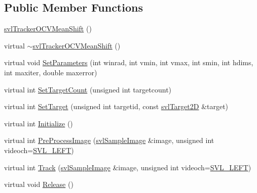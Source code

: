 \subsection*{Public Member Functions}
\begin{DoxyCompactItemize}
\item 
\hyperlink{classsvl_tracker_o_c_v_mean_shift_a3d3446eced3addc41fca298f43703e15}{svl\-Tracker\-O\-C\-V\-Mean\-Shift} ()
\item 
virtual \hyperlink{classsvl_tracker_o_c_v_mean_shift_a7ea83fe3b1d9bfbee4358dc97067eaea}{$\sim$svl\-Tracker\-O\-C\-V\-Mean\-Shift} ()
\item 
virtual void \hyperlink{classsvl_tracker_o_c_v_mean_shift_aef31184a9ab91ca20bc329a4af22ce9a}{Set\-Parameters} (int winrad, int vmin, int vmax, int smin, int hdims, int maxiter, double maxerror)
\item 
virtual int \hyperlink{classsvl_tracker_o_c_v_mean_shift_a323dbe231d319def26e8ce46b734e375}{Set\-Target\-Count} (unsigned int targetcount)
\item 
virtual int \hyperlink{classsvl_tracker_o_c_v_mean_shift_a681e10fbccb458b343bbb3b873a88cab}{Set\-Target} (unsigned int targetid, const \hyperlink{structsvl_target2_d}{svl\-Target2\-D} \&target)
\item 
virtual int \hyperlink{classsvl_tracker_o_c_v_mean_shift_a87583574f4821796798cb340df2b2133}{Initialize} ()
\item 
virtual int \hyperlink{classsvl_tracker_o_c_v_mean_shift_a7a0b8229b75ef85b5aff257df2fcb2cd}{Pre\-Process\-Image} (\hyperlink{classsvl_sample_image}{svl\-Sample\-Image} \&image, unsigned int videoch=\hyperlink{svl_definitions_8h_ab9fec7615f19c8df2919eebcab0b187f}{S\-V\-L\-\_\-\-L\-E\-F\-T})
\item 
virtual int \hyperlink{classsvl_tracker_o_c_v_mean_shift_a35c6c70d76bd53e08fd023e45c8aafe8}{Track} (\hyperlink{classsvl_sample_image}{svl\-Sample\-Image} \&image, unsigned int videoch=\hyperlink{svl_definitions_8h_ab9fec7615f19c8df2919eebcab0b187f}{S\-V\-L\-\_\-\-L\-E\-F\-T})
\item 
virtual void \hyperlink{classsvl_tracker_o_c_v_mean_shift_ae2cf254b0fab604a2d5384a4aa9b97c3}{Release} ()
\end{DoxyCompactItemize}
